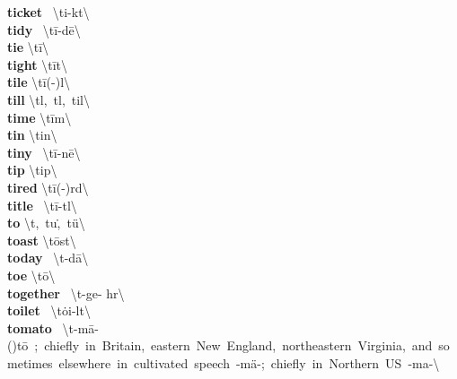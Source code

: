 \documentclass[10pt,a4paper]{article}
\begin{document}
\begin{multicols}{2}
\textbf{ ticket }\quad \ \textbackslash \textprimstress ti-k\textschwa t\textbackslash \\
\textbf{ tidy }\quad \ \textbackslash \textprimstress t\={i}-d\={e}\textbackslash \\
\textbf{ tie }\quad \textbackslash \textprimstress t\={i}\textbackslash \\
\textbf{ tight }\quad \textbackslash \textprimstress t\={i}t\textbackslash \\
\textbf{ tile }\quad \textbackslash \textprimstress t\={i}(-\textschwa )l\textbackslash \\
\textbf{ till }\quad \textbackslash t\textsuperscript{\textreve}l,\ t\textschwa l,\ \textprimstress til\textbackslash \\
\textbf{ time }\quad \textbackslash \textprimstress t\={i}m\textbackslash \\
\textbf{ tin }\quad \textbackslash \textprimstress tin\textbackslash \\
\textbf{ tiny }\quad \ \textbackslash \textprimstress t\={i}-n\={e}\textbackslash \\
\textbf{ tip }\quad \textbackslash \textprimstress tip\textbackslash \\
\textbf{ tired }\quad \textbackslash \textprimstress t\={i}(-\textschwa )rd\textbackslash \\
\textbf{ title }\quad \ \textbackslash \textprimstress t\={i}-t\textsuperscript{\textreve}l\textbackslash \\
\textbf{ to }\quad \textbackslash t\textschwa ,\ tu\. ,\ \textprimstress t\"{u}\textbackslash \\
\textbf{ toast }\quad \textbackslash \textprimstress t\={o}st\textbackslash \\
\textbf{ today }\quad \ \textbackslash t\textschwa -\textprimstress d\={a}\textbackslash \\
\textbf{ toe }\quad \textbackslash \textprimstress t\={o}\textbackslash \\
\textbf{ together }\quad \ \textbackslash t\textschwa -\textprimstress ge- h\textschwa r\textbackslash \\
\textbf{ toilet }\quad \ \textbackslash \textprimstress t\.{o}i-l\textschwa t\textbackslash \\
\textbf{ tomato }\quad \ \textbackslash t\textschwa -\textprimstress m\={a}-(\textsecstress )t\={o}\ ;\ chiefly\ in\ Britain,\ eastern\ New\ England,\ northeastern\ Virginia,\ and\ sometimes\ elsewhere\ in\ cultivated\ speech\ -\textprimstress m\"{a}-;\ chiefly\ in\ Northern\ US\ -\textprimstress ma-\textbackslash \\

\end{multicols}
\end{document}
